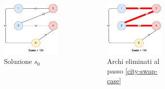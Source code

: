 \documentclass[9pt]{beamer}
\begin{document}
\begin{frame}{\subsecname}
{      \begin{columns}[T,onlytextwidth]
		\begin{figure}[h]
		\centering
		\includegraphics[height=0.25\textheight]
		{../images/graph-greedy-request-order-solution-tsppd-with-two-customers}	
		\caption{Soluzione $s_0$}
		\end{figure}
		\begin{figure}[h]
		\centering
		\includegraphics[height=0.25\textheight]
		{../images/city-swap}	
		\caption{Archi eliminati al passo \ref{city-swap-case}}
		\end{figure}
		\begin{figure}[h]
		\centering

\end{figure}
\end{columns}}
\end{frame}
\end{document}
